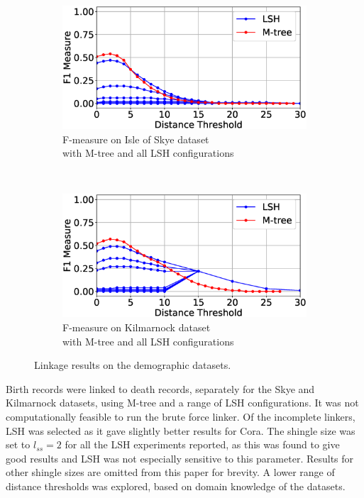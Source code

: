 \documentclass{llncs}
\begin{document}
\begin{figure}[t]
\begin{subfigure}{.46\textwidth}
  \centering
\includegraphics[width=\textwidth]{figures/plotFs-skye-f}
\vspace{-6mm}
\caption{F-measure on Isle of Skye dataset \\ with M-tree and all
LSH configurations}
\end{subfigure}%
~~
\begin{subfigure}{.46\textwidth}
  \centering
\includegraphics[width=\textwidth]{figures/plotFs-kilmarnock-f}
\vspace{-6mm}
\caption{F-measure on Kilmarnock dataset \\ with M-tree and all LSH configurations}
\end{subfigure}
\caption{Linkage results on the demographic datasets.}
\label{demography-quality}
\end{figure}

Birth records were linked to death records, separately for the Skye and
Kilmarnock datasets, using M-tree and a range of LSH configurations. It
was not computationally feasible to run the brute force linker. Of the
incomplete linkers, LSH was selected as it gave slightly better results
for Cora. The shingle size was set to $l_{ss}=2$ for all the LSH
experiments reported, as this was found to give good results and LSH
was not especially sensitive to this parameter. Results for other
shingle sizes are omitted from this paper for brevity. A lower range
of distance thresholds was explored, based on domain knowledge of the
datasets.
\end{document}
